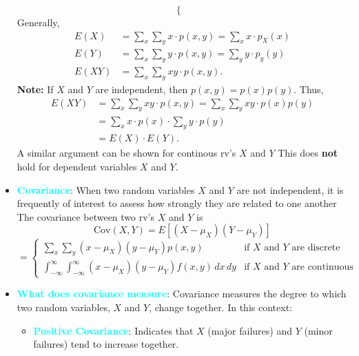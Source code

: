 \documentclass{report}
\begin{document}
\begin{itemize}
\[\begin{cases}
                \end{cases}
            \]
            Generally,
            \begin{align*}
                E(X) &= \sum_{x}\sum_{y}x \cdot p(x,y) = \sum_{x}x\cdot p_{X}(x) \\
                E(Y) &= \sum_{x}\sum_{y}y \cdot p(x,y) = \sum_{y}y\cdot p_{y}(y) \\
                E(XY) &= \sum_{x}\sum_{y} xy \cdot p(x,y) 
            .\end{align*}
            \bigbreak \noindent 
            \textbf{Note:} If $X$ and $Y$ are independent, then $p(x,y) = p(x)p(y)$. Thus,
            \begin{align*}
                E(XY) &= \sum_x\sum_y xy \cdot p(x,y)  = \sum_x\sum_y xy \cdot p(x)p(y)\\
                      &= \sum_x x \cdot p(x) \cdot \sum_y y \cdot p(y) \\
                      &= E(X) \cdot E(Y)
            .\end{align*}
            A similar argument can be shown for continous rv's $X$ and $Y$
            \bigbreak \noindent 
            This does \textbf{not} hold for dependent variables $X$ and $Y$.
        \item \textbf{\textcolor{cyan}{Covariance}}:
            When two random variables $X$ and $Y$ are not independent, it is frequently of interest to assess how strongly they are related to one another
            \bigbreak \noindent 
            The covariance between two rv's \( X \) and \( Y \) is
            \[
                \text{Cov}(X, Y) = E[(X - \mu_X)(Y - \mu_Y)]
            \]
            \[
                = \begin{cases} 
                    \sum_{x} \sum_{y} (x - \mu_X)(y - \mu_Y) p(x, y) & \text{if } X \text{ and } Y \text{ are discrete} \\[10pt]
                    \int_{-\infty}^{\infty} \int_{-\infty}^{\infty} (x - \mu_X)(y - \mu_Y) f(x, y) \, dx \, dy & \text{if } X \text{ and } Y \text{ are continuous}
                \end{cases}
            \]
        \item \textbf{\textcolor{cyan}{What does covariance measure}}:
            Covariance measures the degree to which two random variables, \( X \) and \( Y \), change together. In this context:
            \begin{itemize}
                \item \textbf{\textcolor{cyan}{Positive Covariance}}: Indicates that \( X \) (major failures) and \( Y \) (minor failures) tend to increase together. 

\end{itemize}
\end{itemize}
\end{document}
